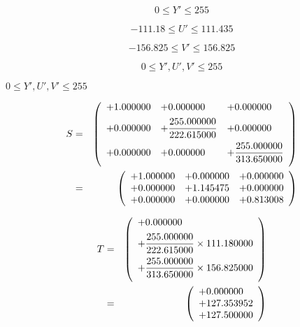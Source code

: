 \documentclass{article}
\begin{document}
\[ 0 \le Y' \le 255 \]
\pagebreak

\[ -111.18 \le U' \le 111.435 \]
\pagebreak

\[ -156.825 \le V' \le 156.825 \]
\pagebreak

\[ 0 \le Y', U', V' \le 255 \]
\pagebreak

$ 0 \le Y', U', V' \le 255 $
\pagebreak

\begin{eqnarray*} S &=& \left( \begin{array}{lll} +1.000000 & +0.000000 & +0.000000 \vspace{.5em} \\ +0.000000 & +\dfrac{255.000000}{222.615000} & +0.000000 \vspace{.5em} \\ +0.000000 & +0.000000 & +\dfrac{255.000000}{313.650000} \vspace{.5em} \\ \end{array} \right) \\ &=& \left( \begin{array}{lll} +1.000000 & +0.000000 & +0.000000 \\ +0.000000 & +1.145475 & +0.000000 \\ +0.000000 & +0.000000 & +0.813008 \\ \end{array} \right) \end{eqnarray*}
\pagebreak

\begin{eqnarray*} T &=& \left( \begin{array}{l} +0.000000 \vspace{.5em} \\ +\dfrac{255.000000}{222.615000}\times 111.180000 \vspace{.5em} \\ +\dfrac{255.000000}{313.650000}\times 156.825000 \vspace{.5em} \\ \end{array} \right) \\ &=& \left( \begin{array}{lll} +0.000000 \\ +127.353952 \\ +127.500000 \\ \end{array} \right) \\ \end{eqnarray*}
\pagebreak
\end{document}
